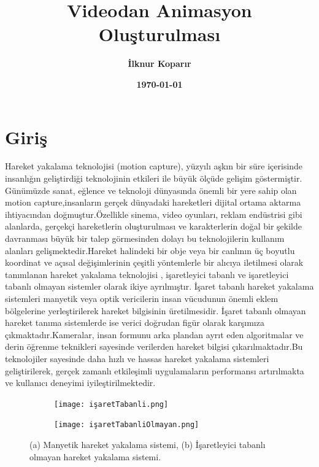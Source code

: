 \documentclass[12pt, a4paper]{article}
\title{\textbf{Videodan Animasyon Oluşturulması}\large }
\author{\textbf{İlknur Koparır}\large}
\date{\textbf{\today}}
\begin{document}
	
	\maketitle
	
	\thispagestyle{empty}
	
	\newpage

	\newpage

\newpage
\section{Giriş}  Hareket yakalama teknolojisi (motion capture), yüzyılı aşkın bir süre içerisinde
insanlığın geliştirdiği teknolojinin etkileri ile büyük ölçüde gelişim göstermiştir.
Günümüzde sanat, eğlence ve teknoloji dünyasında önemli bir yere sahip olan motion capture,insanların gerçek dünyadaki hareketleri dijital ortama aktarma ihtiyacından doğmuştur.Özellikle sinema, video oyunları,
reklam endüstrisi gibi alanlarda, gerçekçi hareketlerin oluşturulması ve karakterlerin doğal bir şekilde davranması büyük bir talep görmesinden dolayı bu teknolojilerin kullanım alanları gelişmektedir.Hareket halindeki bir obje veya bir canlının üç boyutlu koordinat ve açısal değişimlerinin çeşitli yöntemlerle
bir alıcıya iletilmesi olarak tanımlanan hareket yakalama teknolojisi  \cite{ozkiricscci2022motion}, işaretleyici tabanlı ve işaretleyici tabanlı olmayan sistemler
olarak ikiye ayrılmıştır. İşaret tabanlı hareket yakalama sistemleri manyetik veya optik vericilerin insan vücudunun önemli eklem bölgelerine yerleştirilerek hareket bilgisinin üretilmesidir. İşaret tabanlı olmayan hareket tanıma sistemlerde ise verici doğrudan figür olarak karşımıza çıkmaktadır.Kameralar, insan formunu arka plandan ayrıt eden algoritmalar ve derin öğrenme teknikleri sayesinde verilerden hareket bilgisi çıkarılmaktadır.Bu teknolojiler sayesinde  daha hızlı ve hassas hareket yakalama sistemleri geliştirilerek, gerçek zamanlı etkileşimli uygulamaların performansı artırılmakta ve kullanıcı deneyimi iyileştirilmektedir.\\
\begin{figure}[h!]
	\centering
	\begin{subfigure}[b]{0.4\linewidth}
		\texttt{[image: işaretTabanli.png]}
		\caption{}
	\end{subfigure}
	\begin{subfigure}[b]{0.4\linewidth}
		\texttt{[image: işaretTabanliOlmayan.png]}
		\caption{}
	\end{subfigure}
	\caption{(a) Manyetik hareket yakalama sistemi, (b) İşaretleyici tabanlı olmayan hareket yakalama sistemi.}
\end{figure}
\newpage
\end{document}
